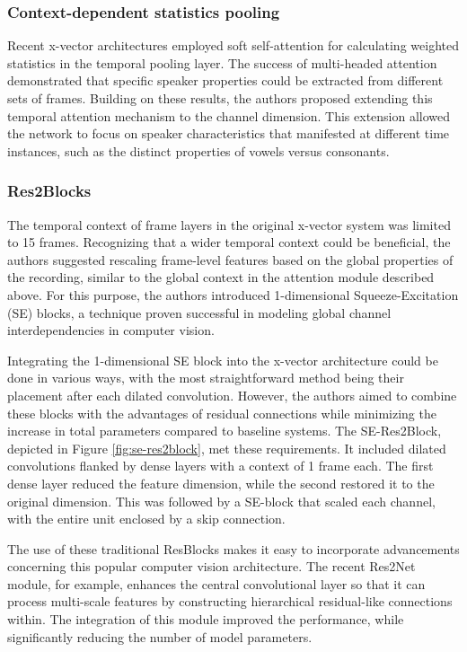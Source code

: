 \subsubsection{Context-dependent statistics pooling}
Recent x-vector architectures employed soft self-attention for calculating weighted statistics in the temporal pooling layer. The success of multi-headed attention demonstrated that specific speaker properties could be extracted from different sets of frames. Building on these results, the authors proposed extending this temporal attention mechanism to the channel dimension. This extension allowed the network to focus on speaker characteristics that manifested at different time instances, such as the distinct properties of vowels versus consonants.

\subsubsection{Res2Blocks}
The temporal context of frame layers in the original x-vector system was limited to 15 frames. Recognizing that a wider temporal context could be beneficial, the authors suggested rescaling frame-level features based on the global properties of the recording, similar to the global context in the attention module described above. For this purpose, the authors introduced 1-dimensional Squeeze-Excitation (SE) blocks, a technique proven successful in modeling global channel interdependencies in computer vision.

Integrating the 1-dimensional SE block into the x-vector architecture could be done in various ways, with the most straightforward method being their placement after each dilated convolution. However, the authors aimed to combine these blocks with the advantages of residual connections while minimizing the increase in total parameters compared to baseline systems. The SE-Res2Block, depicted in Figure \ref{fig:se-res2block}, met these requirements. It included dilated convolutions flanked by dense layers with a context of 1 frame each. The first dense layer reduced the feature dimension, while the second restored it to the original dimension. This was followed by a SE-block that scaled each channel, with the entire unit enclosed by a skip connection.

The use of these traditional ResBlocks makes it easy to incorporate advancements concerning this popular computer vision architecture. The recent Res2Net module, for example, enhances the central convolutional layer so that it can process multi-scale features by constructing hierarchical residual-like connections within. The integration of this module improved the performance, while significantly reducing the number of model parameters.

